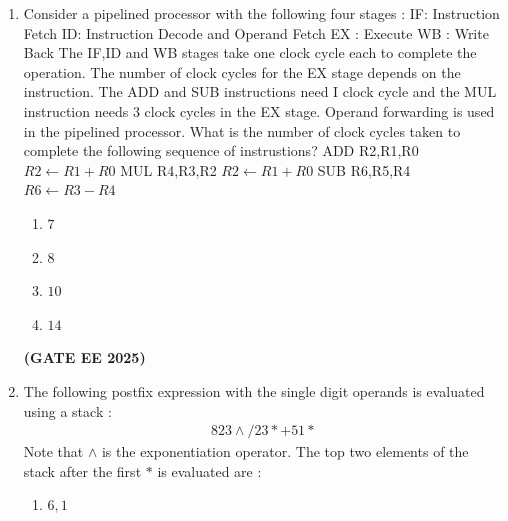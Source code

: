 \documentclass[journal,12pt,onecolumn]{IEEEtran}
\theoremstyle{remark}
\begin{document}
\begin{enumerate}
\begin{enumerate}
\begin{multicols}{2}
               \end{multicols} 
            \end{enumerate}
           \hfill \textbf{(GATE EE 2025)}
             
            \item Consider a pipelined processor with the following four stages :
            \newline
            IF: Instruction Fetch 
            \newline
            ID: Instruction Decode and Operand Fetch 
            \newline 
            EX : Execute
            \newline 
            WB : Write Back
            \newline
            The IF,ID and WB stages take one clock cycle each to complete the operation. The number of clock cycles  for the EX stage depends on the instruction. The ADD and SUB instructions need I clock  cycle and the MUL instruction needs $3$ clock cycles in the EX stage. Operand forwarding is used in the pipelined processor. What is the number of clock cycles taken to complete the following sequence of instrustions?
            \newline 
            ADD  R2,R1,R0  \quad    $ R2 \longleftarrow R1+R0 $  
            \newline
            MUL R4,R3,R2  \quad    $ R2 \longleftarrow R1+R0 $ 
            SUB  R6,R5,R4 \quad    $ R6 \longleftarrow R3-R4$
            \begin{enumerate}
                \item $7$
                \item $8$
                \item $10$
                \item $14$
            \end{enumerate}
            \hfill \textbf{(GATE EE 2025)}
            \item The following postfix expression with the single digit operands  is evaluated using a stack :
            \newline
    \begin{align}
        823 \wedge  / 23 * +51 *
    \end{align}
    \newline
    Note that $\wedge$ is the exponentiation operator. The top two elements of the stack after the first $*$ is evaluated are :
    \begin{enumerate}
        \item $6,1$

\end{enumerate}
\end{enumerate}
\end{document}
